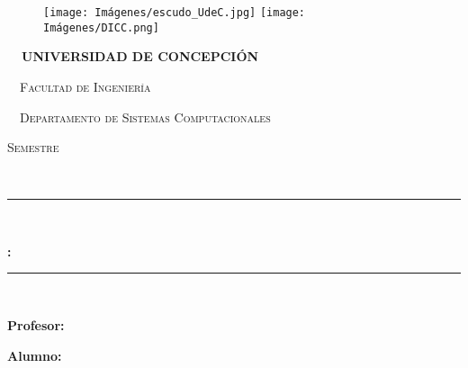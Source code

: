 \thispagestyle{empty}
            \newcommand{\HRule}{\rule{\linewidth}{0.5mm}}		
			\begin{figure}[ht]
				\texttt{[image: Imágenes/escudo\_UdeC.jpg]}
				\label{escudoTecNM}
		   \endminipage
		   \vspace{-2.0cm}
				\texttt{[image: Imágenes/DICC.png]}
				\label{EscudoITCJ}
			\endminipage
		\end{figure}
		
		\vspace{-2.0cm}
		
		\begin{center}
		    {\scshape \Large \textbf{\ \ UNIVERSIDAD DE CONCEPCIÓN} \par}
			{\scshape\Large \ \ Facultad de Ingeniería \par}
			{\scshape\large \ \ Departamento de Sistemas Computacionales \par}
            {\scshape\Large Semestre \mySemester \par}
             {\Large \ \ \myMateria}
            \vspace{0.75cm}
			\begin{center}
			
			
			
			\HRule \\[0.4cm]
			{\LARGE\bfseries \MyReport :\\\myUnidad\par}
            \HRule \\[0.4cm]
		{\scshape\Large \myDate\par} %
        \vspace{0.75cm}
	    \LARGE	{ \textbf{Profesor:}}\\
        \large		{ \myTeacher}
        
		\vspace{0.5cm}	
		
		\LARGE	{ \textbf{Alumno:}}
        
        \normalsize	 {\myName}

				\vspace{1.25cm}
				\vspace{0.9cm}
				
			\end{center}
	
		\end{center}